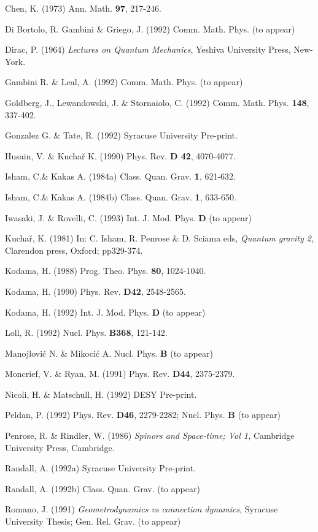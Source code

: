 \item{}{Chen, K. (1973) Ann. Math. {\bf 97}, 217-246.}
\item{}{Di Bortolo, R. Gambini \& Griego, J. (1992) Comm. Math. Phys.
(to appear)}
\item{}{Dirac, P. (1964) {\it Lectures on Quantum Mechanics}, Yeshiva
University Press, New-York.}
\item{}{Gambini R. \& Leal, A. (1992) Comm. Math. Phys. (to appear)}
\item{}{Goldberg, J., Lewandowski, J. \& Stornaiolo, C. (1992) Comm. Math.
Phys. {\bf 148}, 337-402.}
\item{}{Gonzalez G. \& Tate, R. (1992) Syracuse University Pre-print.}
\item{}{Husain, V. \& Kucha\v r K. (1990) Phys. Rev. {\bf D 42}, 4070-4077.}
\item{}{Isham, C.\& Kakas A. (1984a) Class. Quan. Grav. {\bf 1}, 621-632.}
\item{}{Isham, C.\& Kakas A. (1984b) Class. Quan. Grav. {\bf 1}, 633-650.}
\item{}{Iwasaki, J. \& Rovelli, C. (1993) Int. J. Mod. Phys. {\bf D}
(to appear)}
\item{}{Kucha\v r, K. (1981) In: C. Isham, R. Penrose \& D. Sciama eds,
{\it Quantum gravity 2}, Clarendon press, Oxford; pp329-374.}
\item{}{Kodama, H. (1988) Prog. Theo. Phys. {\bf 80}, 1024-1040.}
\item{}{Kodama, H. (1990) Phys. Rev. {\bf D42}, 2548-2565.}
\item{}{Kodama, H. (1992) Int. J. Mod. Phys. {\bf D} (to appear)}
\item{}{Loll, R. (1992) Nucl. Phys. {\bf B368}, 121-142.}
\item{}{Manojlovi\'c N. \& Mikoci\'c A. Nucl. Phys. {\bf B} (to appear)}
\item{}{Moncrief, V. \& Ryan, M. (1991) Phys. Rev. {\bf D44}, 2375-2379.}
\item{}{Nicoli, H. \& Matschull, H. (1992) DESY Pre-print.}
\item{}{Peldan, P. (1992) Phys. Rev. {\bf D46}, 2279-2282; Nucl. Phys.
{\bf B} (to appear)}
\item{}{Penrose, R. \& Rindler, W. (1986) {\it Spinors and Space-time;
Vol 1,} Cambridge University Press, Cambridge.}
\item{}{Randall, A. (1992a) Syracuse University Pre-print.}
\item{}{Randall, A. (1992b) Class. Quan. Grav. (to appear)}
\item{}{Romano, J. (1991) {\it Geometrodynamics vs connection dynamics},
Syracuse University Thesis;  Gen. Rel. Grav. (to appear)}
